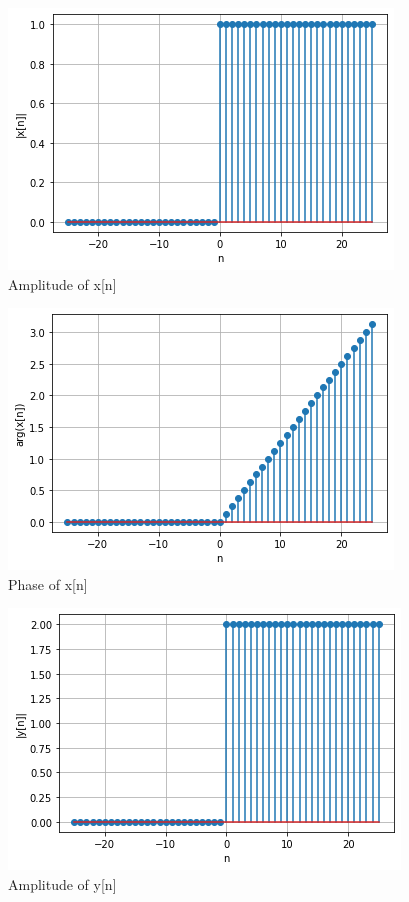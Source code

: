 \documentclass[journal,12pt,twocolumn]{IEEEtran}
\begin{document}
\begin{figure}[!htp]
    \centering
    \includegraphics[width = \columnwidth]{1.PNG}
    \caption{Amplitude of x[n]}
    \label{f1}
\end{figure}

\begin{figure}[!htp]
    \centering
    \includegraphics[width = \columnwidth]{2.PNG}
    \caption{Phase of x[n]}
    \label{f2}
\end{figure}

\begin{figure}[!htp]
    \centering
    \includegraphics[width = \columnwidth]{3.PNG}
    \caption{Amplitude of y[n]}
    \label{f3}
\end{figure}
\end{document}
